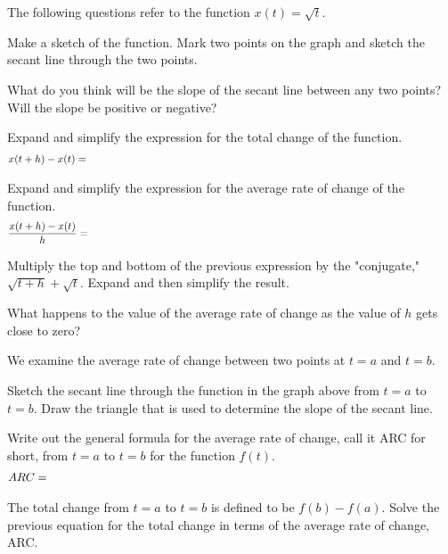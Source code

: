 \begin{problem}
    \item The following questions refer to the function $x(t)=\sqrt{t}$.
      \begin{subproblem}
        \item  Make a sketch of the function. Mark two points on the
          graph and sketch the secant line through the two points.
          \vfill
        \item What do you think will be the slope of the secant line
          between any two points? Will the slope be positive or negative?
          \vspace{1em}
        \item Expand and simplify the expression for the total change
          of the function.
          \begin{eqnarray*}
            x(t+h)-x(t) & = & \hskip \textwidth
          \end{eqnarray*}
          \vfill
        \item Expand and simplify the expression for the average rate
          of change of the function.
        \begin{eqnarray*}
          \frac{x(t+h)-x(t)}{h} & = & \hskip \textwidth
        \end{eqnarray*}
        \vfill
        \item Multiply the top and bottom of the previous expression
          by the "conjugate," ${\displaystyle \sqrt{t+h}+\sqrt{t}}$.
          Expand and then simplify the result.
          \vfill
      \item What happens to the value of the average rate of change as
        the value of $h$ gets close to zero?
        \vspace{3em}
      \end{subproblem}

      \clearpage

    \item We examine the average rate of change between two points at
      $t=a$ and $t=b$.

      \scalebox{0.7}{}

      \begin{subproblem}
      \item Sketch the secant line through the function in the graph above
        from $t=a$ to $t=b$. Draw the triangle that is used to determine
        the slope of the secant line.
      \item Write out the general formula for the average rate of change,
        call it ARC for short, from $t=a$ to $t=b$ for the function
        $f(t)$.
        \begin{eqnarray*}
          ARC & = & \hskip \textwidth
        \end{eqnarray*}
        \vspace{2em}
      \item The total change from $t=a$ to $t=b$ is defined to be
        $f(b)-f(a)$. Solve the previous equation for the total change in
        terms of the average rate of change, ARC.
        \vfill
      \end{subproblem}

\end{problem}

